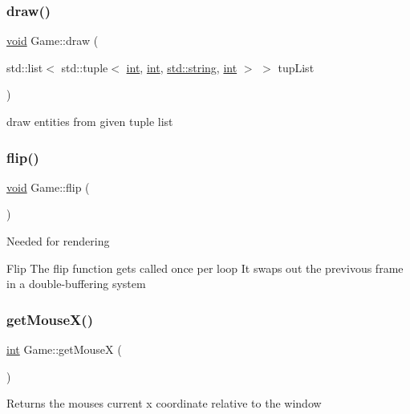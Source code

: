 \subsubsection{\texorpdfstring{draw()}{draw()}}
{\footnotesize\ttfamily \mbox{\hyperlink{_s_d_l__opengles2__gl2ext_8h_ae5d8fa23ad07c48bb609509eae494c95}{void}} Game\+::draw (\begin{DoxyParamCaption}\item[{std\+::list$<$ std\+::tuple$<$ \mbox{\hyperlink{warnings_8h_a74f207b5aa4ba51c3a2ad59b219a423b}{int}}, \mbox{\hyperlink{warnings_8h_a74f207b5aa4ba51c3a2ad59b219a423b}{int}}, \mbox{\hyperlink{_s_d_l__opengl__glext_8h_ab4ccfaa8ab0e1afaae94dc96ef52dde1}{std\+::string}}, \mbox{\hyperlink{warnings_8h_a74f207b5aa4ba51c3a2ad59b219a423b}{int}} $>$ $>$}]{tup\+List }\end{DoxyParamCaption})}

draw entities from given tuple list \mbox{\label{class_game_a1018ac77db757af6826cbd712da5e20e}} 
\subsubsection{\texorpdfstring{flip()}{flip()}}
{\footnotesize\ttfamily \mbox{\hyperlink{_s_d_l__opengles2__gl2ext_8h_ae5d8fa23ad07c48bb609509eae494c95}{void}} Game\+::flip (\begin{DoxyParamCaption}{ }\end{DoxyParamCaption})}

Needed for rendering

Flip The flip function gets called once per loop It swaps out the previvous frame in a double-\/buffering system \mbox{\label{class_game_ad8d6d28b0469587b7641d9f706c35e0c}} 
\subsubsection{\texorpdfstring{getMouseX()}{getMouseX()}}
{\footnotesize\ttfamily \mbox{\hyperlink{warnings_8h_a74f207b5aa4ba51c3a2ad59b219a423b}{int}} Game\+::get\+MouseX (\begin{DoxyParamCaption}{ }\end{DoxyParamCaption})}

Returns the mouse\textquotesingle{}s current x coordinate relative to the window \mbox{\label{class_game_a802bb7ac7db292d86099d8712f2988fc}} 
